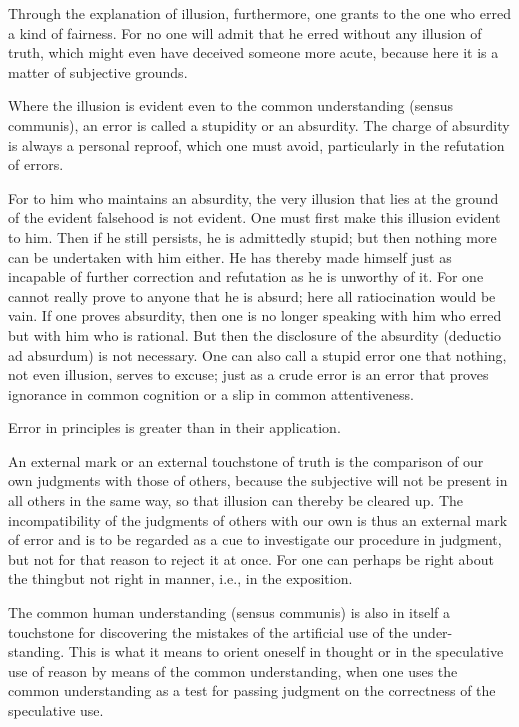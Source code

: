 Through the explanation of illusion, furthermore, one grants to the one
who erred a kind of fairness. For no one will admit that he erred without
any illusion of truth, which might even have deceived someone more
acute, because here it is a matter of subjective grounds.

Where the illusion is evident even to the common understanding (sensus
communis), an error is called a stupidity or an absurdity. The charge of
absurdity is always a personal reproof, which one must avoid, particularly
in the refutation of errors.

For to him who maintains an absurdity, the very illusion that lies at the
ground of the evident falsehood is not evident. One must first make this
illusion evident to him. Then if he still persists, he is admittedly stupid;
but then nothing more can be undertaken with him either. He has thereby
made himself just as incapable of further correction and refutation as he is
unworthy of it. For one cannot really prove to anyone that he is absurd;
here all ratiocination would be vain. If one proves absurdity, then one is no
longer speaking with him who erred but with him who is rational. But then
the disclosure of the absurdity (deductio ad absurdum) is not necessary.
One can also call a stupid error one that nothing, not even illusion, serves
to excuse; just as a crude error is an error that proves ignorance in common
cognition or a slip in common attentiveness.

Error in principles is greater than in their application.

An external mark or an external touchstone of truth is the comparison of
our own judgments with those of others, because the subjective will not be
present in all others in the same way, so that illusion can thereby be
cleared up. The incompatibility of the judgments of others with our own is
thus an external mark of error and is to be regarded as a cue to investigate
our procedure in judgment, but not for that reason to reject it at once. For
one can perhaps be right about the thingbut not right in manner, i.e., in the
exposition.

The common human understanding (sensus communis) is also in itself a
touchstone for discovering the mistakes of the artificial use of the under-
standing. This is what it means to orient oneself in thought or in the
speculative use of reason by means of the common understanding, when
one uses the common understanding as a test for passing judgment on the
correctness of the speculative use.

